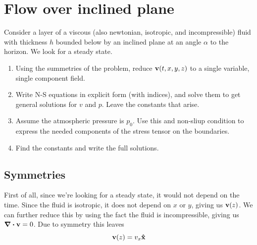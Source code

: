 \clearpage
\section{Flow over inclined plane}
\begin{colbox}
    Consider a layer of a viscous (also newtonian, isotropic, and incompressible) fluid with thickness \(h\) bounded below by an inclined plane at an angle \(\alpha\) to the horizon. We look for a steady state.
    \begin{enumerate}
        \item Using the summetries of the problem, reduce \(\vb{v}(t,x,y,z)\) to a single variable, single component field.
        \item Write N-S equations in explicit form (with indices), and solve them to get general solutions for \(v\) and \(p\). Leave the constants that arise.
        \item Assume the atmospheric pressure is \(p_0\). Use this and non-sliup condition to express the needed components of the stress tensor on the boundaries.
        \item Find the constants and write the full solutions.
        \end{enumerate}
\end{colbox}
\subsection{Symmetries}
First of all, since we're looking for a steady state, it would not depend on the time. Since the fluid is isotropic, it does not depend on \(x\) or \(y\), giving us \(\vb{v}(z)\). We can further reduce this by using the fact the fluid is incompressible, giving us \(\div{\vb{v}}=0\). Due to symmetry this leaves
\begin{equation}
    \vb{v}(z) = v_x\vu{x}
\end{equation}
